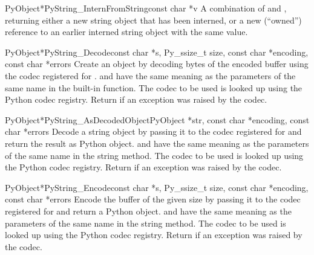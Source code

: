 \begin{cfuncdesc}{PyObject*}{PyString_InternFromString}{const char *v}
  A combination of  and
  , returning either a new string
  object that has been interned, or a new (``owned'') reference to an
  earlier interned string object with the same value.
\end{cfuncdesc}

\begin{cfuncdesc}{PyObject*}{PyString_Decode}{const char *s,
                                               Py_ssize_t size,
                                               const char *encoding,
                                               const char *errors}
  Create an object by decoding  bytes of the encoded
  buffer  using the codec registered for
  .   and  have the same
  meaning as the parameters of the same name in the
   built-in function.  The codec to be used is
  looked up using the Python codec registry.  Return \NULL{} if
  an exception was raised by the codec.
\end{cfuncdesc}

\begin{cfuncdesc}{PyObject*}{PyString_AsDecodedObject}{PyObject *str,
                                               const char *encoding,
                                               const char *errors}
  Decode a string object by passing it to the codec registered for
   and return the result as Python
  object.  and  have the same meaning as the
  parameters of the same name in the string  method.
  The codec to be used is looked up using the Python codec registry.
  Return \NULL{} if an exception was raised by the codec.
\end{cfuncdesc}

\begin{cfuncdesc}{PyObject*}{PyString_Encode}{const char *s,
                                               Py_ssize_t size,
                                               const char *encoding,
                                               const char *errors}
  Encode the  buffer of the given size by passing it to
  the codec registered for  and return a Python object.
   and  have the same meaning as the
  parameters of the same name in the string  method.
  The codec to be used is looked up using the Python codec
  registry.  Return \NULL{} if an exception was raised by the
  codec.
\end{cfuncdesc}

